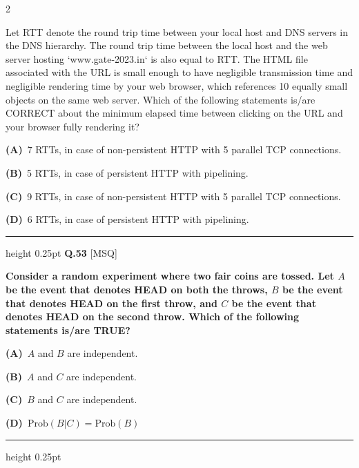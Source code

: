 \documentclass[a4paper,10pt,twoside]{article}
\begin{document}
\begin{multicols}{2}
{Let RTT denote the round trip time between your local host and DNS servers in the DNS hierarchy. The round trip time between the local host and the web server hosting `www.gate-2023.in` is also equal to RTT. The HTML file associated with the URL is small enough to have negligible transmission time and negligible rendering time by your web browser, which references 10 equally small objects on the same web server.
Which of the following statements is/are CORRECT about the minimum elapsed time between clicking on the URL and your browser fully rendering it? \par}
\par\vspace{2pt}\noindent
\textbf{(A)}~7 RTTs, in case of non-persistent HTTP with 5 parallel TCP connections.\par\vspace{2pt}\noindent
\textbf{(B)}~5 RTTs, in case of persistent HTTP with pipelining.\par\vspace{2pt}\noindent
\textbf{(C)}~9 RTTs, in case of non-persistent HTTP with 5 parallel TCP connections.\par\vspace{2pt}\noindent
\textbf{(D)}~6 RTTs, in case of persistent HTTP with pipelining.
\par\vspace{6pt}\hrule height 0.25pt\vspace{6pt}
\noindent\textbf{Q.53} \hfill {\footnotesize\textsf{[MSQ]}}
\par\vspace{2pt}
{\bfseries Consider a random experiment where two fair coins are tossed. Let $A$ be the event that denotes HEAD on both the throws, $B$ be the event that denotes HEAD on the first throw, and $C$ be the event that denotes HEAD on the second throw.
Which of the following statements is/are TRUE? \par}
\par\vspace{2pt}\noindent
\textbf{(A)}~$A$ and $B$ are independent.\par\vspace{2pt}\noindent
\textbf{(B)}~$A$ and $C$ are independent.\par\vspace{2pt}\noindent
\textbf{(C)}~$B$ and $C$ are independent.\par\vspace{2pt}\noindent
\textbf{(D)}~$\text{Prob}(B|C) = \text{Prob}(B)$
\par\vspace{6pt}\hrule height 0.25pt\vspace{6pt}

\end{multicols}
\end{document}
